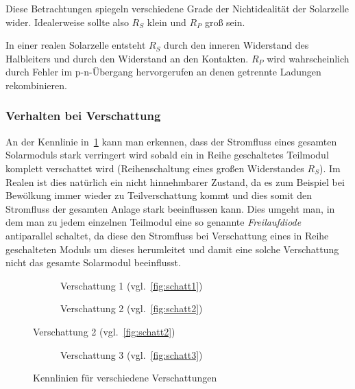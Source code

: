 \documentclass[slug=SZ, room=Hermann-Krone-Bau\,\ Labor\ 1.25,
supervisor=Martin\ Kroll, coursedate=14.\ 11.\ 2019]{../../Lab_Report_LaTeX/lab_report}
\begin{document}
Diese Betrachtungen spiegeln verschiedene Grade der Nichtidealit\"at
der Solarzelle wider. Idealerweise sollte also \(R_S\) klein und
\(R_P\) gro\ss{} sein.

In einer realen Solarzelle entsteht \(R_S\) durch den inneren
Widerstand des Halbleiters und durch den Widerstand an den Kontakten.
\(R_P\) wird wahrscheinlich durch Fehler im p-n-\"Ubergang
hervorgerufen an denen getrennte Ladungen rekombinieren.


\subsubsection{Verhalten bei Verschattung}
\label{sec:verschattung}


An der Kennlinie in~\ref{diag:verschattung1} kann man erkennen, dass
der Stromfluss eines gesamten Solarmoduls stark verringert wird sobald
ein in Reihe geschaltetes Teilmodul komplett verschattet wird
(Reihenschaltung eines gro\ss{}en Widerstandes \(R_S\)).  Im Realen
ist dies natürlich ein nicht hinnehmbarer Zustand, da es zum Beispiel
bei Bewölkung immer wieder zu Teilverschattung kommt und dies somit
den Stromfluss der gesamten Anlage stark beeinflussen kann.  Dies
umgeht man, in dem man zu jedem einzelnen Teilmodul eine so genannte
\emph{Freilaufdiode}\cite{wikipedia_solmod}
antiparallel schaltet, da diese den
Stromfluss bei Verschattung eines in Reihe geschalteten Moduls um
dieses herumleitet und damit eine solche Verschattung nicht das
gesamte Solarmodul beeinflusst.

\begin{figure}[H]\centering
  \begin{subfigure}[b]{1\textwidth}\centering
    
    \caption{Verschattung 1 (vgl.~\ref{fig:schatt1})}
    \label{diag:verschattung1}
  \end{subfigure}
  \begin{subfigure}[b]{1\textwidth}\centering
    
    \caption{Verschattung 2 (vgl.~\ref{fig:schatt2})}
    \label{diag:verschattung2}
  \end{subfigure}
\end{figure}

\begin{figure}[H]\centering
  \ContinuedFloat
  \begin{subfigure}[b]{1\textwidth}\centering
    
    \caption{Verschattung 3 (vgl.~\ref{fig:schatt3})}
    \label{diag:verschattung3}
  \end{subfigure}
  \caption{Kennlinien für verschiedene Verschattungen}
  \label{fig:verschattung}
\end{figure}
\end{document}
